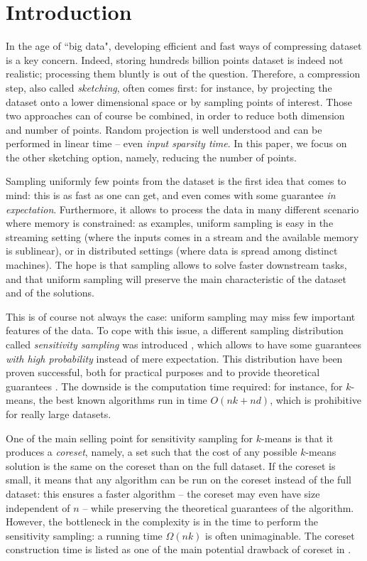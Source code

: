 \section{Introduction}

In the age of ``big data", developing efficient and fast ways of compressing dataset is a key concern. Indeed, storing hundreds billion points dataset is indeed not realistic; processing them bluntly is out of the question. 
Therefore, a compression step, also called \textit{sketching}, often comes first: for instance, by projecting the dataset onto a lower dimensional space or by sampling points of interest. Those two approaches can of course be combined, in order to reduce both dimension and number of points. 
Random projection is well understood and can be performed in linear time -- even \textit{input sparsity time}. 
In this paper, we focus on the other sketching option, namely, reducing the number of points.

Sampling uniformly few points from the dataset is the first idea that comes to mind: this is as fast as one can get, and even comes with some guarantee \emph{in expectation}. 
Furthermore, it allows to process the data in many different scenario where memory is constrained: as examples, uniform sampling is easy in the streaming setting (where the inputs comes in a stream and the available memory is sublinear), or in distributed settings (where data is spread among distinct machines).
The hope is that sampling allows to solve faster downstream tasks, and that uniform sampling will preserve the main characteristic of the dataset and of the solutions.

This is of course not always the case: uniform sampling may miss few important features of the data. 
To cope with this issue, a different sampling distribution called \textit{sensitivity sampling} was introduced \cite{LS10}, which allows to have some guarantees \textit{with high probability} instead of mere expectation.
This distribution have been proven successful, both for practical purposes \cite{} and to provide theoretical guarantees \cite{FeldmanL11, CohenP15}. 
The downside is the computation time required: for instance, for $k$-means, the best known algorithms run in time $O(nk+nd)$, which is prohibitive for really large datasets.

One of the main selling point for sensitivity sampling for $k$-means is that it produces a \textit{coreset}, namely, a set such that the cost of any possible $k$-means solution is the same on the coreset than on the full dataset.
If the coreset is small, it means that any algorithm can be run on the coreset instead of the full dataset: this ensures a faster algorithm  -- the coreset may even have size independent of $n$ -- while preserving the theoretical guarantees of the algorithm.
However, the bottleneck in the complexity is in the time to perform the sensitivity sampling: a running time $\Omega(nk)$ is often 	unimaginable. The coreset construction time is listed as one of the main potential drawback of coreset in \cite{Feldman20}.


